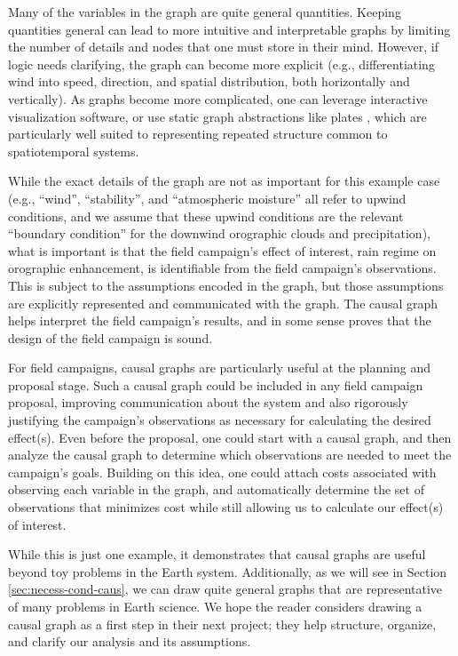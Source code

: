 \documentclass[12pt]{article}
\begin{document}
Many of the variables in the graph are quite general
quantities. Keeping quantities general can lead to more intuitive and
interpretable graphs by limiting the number of details and nodes that
one must store in their mind. However, if logic needs clarifying, the
graph can become more explicit (e.g., differentiating wind into speed,
direction, and spatial distribution, both horizontally and
vertically). As graphs become more complicated, one can leverage
interactive visualization software, or use static graph abstractions
like plates \citep{bishop2006pattern}, which are particularly well
suited to representing repeated structure common to spatiotemporal
systems.

While the exact details of the graph are not as important for this
example case (e.g., ``wind'', ``stability'', and ``atmospheric
moisture'' all refer to upwind conditions, and we assume that these
upwind conditions are the relevant ``boundary condition'' for the
downwind orographic clouds and precipitation), what is important is
that the field campaign's effect of interest, rain regime on
orographic enhancement, is identifiable from the field campaign's
observations. This is subject to the assumptions encoded in the graph,
but those assumptions are explicitly represented and communicated with
the graph. The causal graph helps interpret the field campaign's
results, and in some sense proves that the design of the field
campaign is sound.

For field campaigns, causal graphs are particularly useful at the
planning and proposal stage. Such a causal graph could be included in
any field campaign proposal, improving communication about the system
and also rigorously justifying the campaign’s observations as
necessary for calculating the desired effect(s). Even before the
proposal, one could start with a causal graph, and then analyze the
causal graph to determine which observations are needed to meet the
campaign’s goals. Building on this idea, one could attach costs
associated with observing each variable in the graph, and
automatically determine the set of observations that minimizes cost
while still allowing us to calculate our effect(s) of interest.

While this is just one example, it demonstrates that causal graphs are
useful beyond toy problems in the Earth system. Additionally, as we
will see in Section \ref{sec:necess-cond-caus}, we can draw quite
general graphs that are representative of many problems in Earth
science. We hope the reader considers drawing a causal graph as a
first step in their next project; they help structure, organize, and
clarify our analysis and its assumptions.
\end{document}

